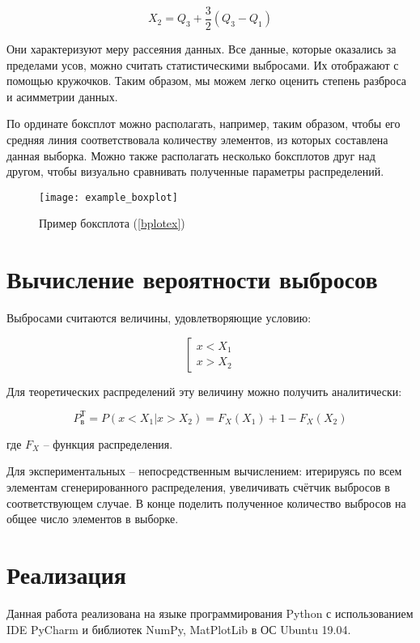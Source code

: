 \begin{equation}
	X_2 = Q_3 + \frac{3}{2}(Q_3-Q_1)
\end{equation}

Они характеризуют меру рассеяния данных. Все данные, которые оказались за пределами усов, можно считать статистическими выбросами. Их отображают с помощью кружочков. Таким образом, мы можем легко оценить степень разброса и асимметрии данных.

По ординате боксплот можно располагать, например, таким образом, чтобы его средняя линия соответствовала количеству элементов, из которых составлена данная выборка. Можно также располагать несколько боксплотов друг над другом, чтобы визуально сравнивать полученные параметры распределений.

\begin{figure}[H]
	\begin{center}
		\texttt{[image: example\_boxplot]}
		\caption{Пример боксплота (\ref{bplotex})}
		\label{pic:pic_name}	
	\end{center}
\end{figure}

\section{Вычисление вероятности выбросов}

Выбросами считаются величины, удовлетворяющие условию:


\begin{equation}
\left[
\begin{array}{c}
x < X_1 \\
x > X_2
\end{array}
\right.
\end{equation}

Для теоретических распределений эту величину можно получить аналитически:

\begin{equation}\label{trashdata}
P_{\text{в}}^{\text{Т}}=P(x<X_1 | x > X_2) = F_X(X_1) + 1 - F_X(X_2)
\end{equation}

где $F_X$ -- функция распределения.

Для экспериментальных -- непосредственным вычислением: итерируясь по всем элементам сгенерированного распределения, увеличивать счётчик выбросов в соответствующем случае. В конце поделить полученное количество выбросов на общее число элементов в выборке.
	
\section{Реализация}
Данная работа реализована на языке программирования Python с использованием IDE PyCharm и библиотек NumPy, MatPlotLib в ОС Ubuntu 19.04.

